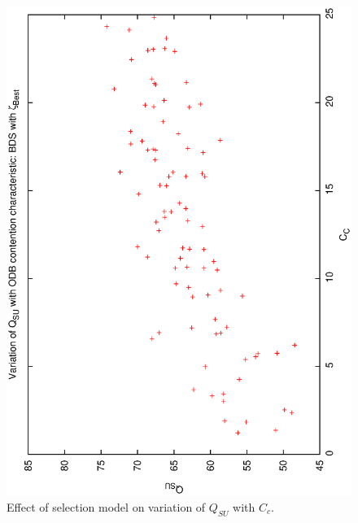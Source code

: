\begin{figure}[h]
 \label{fig:qsucc_best}
\begin{center}
 \includegraphics[scale=0.5, angle=-90]{figures/qsucc_best.eps}
 \caption[Effect of selection model on variation of $Q_{SU}$ with $C_c$.] 
   {Effect of selection model on variation of $Q_{SU}$ with $C_c$.}
\end{center}
\end{figure}

